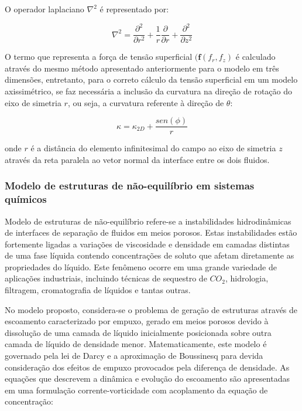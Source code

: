\documentclass[a4paper,portuges,12pt]{article}
\begin{document}
O operador laplaciano $\nabla^2$ é representado por:

\begin{equation}
	\nabla^2 
	=
	\frac{\partial^2}{\partial r^2}
	+
	\frac{1}{r}
	\frac{\partial}{\partial r}
	+
	\frac{\partial^2}{\partial z^2}
\label{eq:laplacianAxi}
\end{equation}\vspace{0.5cm}

O termo que representa a força de tensão superficial
$(\mathbf{f}(f_r,f_z)$ é calculado através do mesmo método apresentado
anteriormente para o modelo em três dimensões, entretanto, para o
correto cálculo da tensão superficial em um modelo axissimétrico, se faz
necessária a inclusão da curvatura na direção de rotação do eixo de
simetria $r$, ou seja, a curvatura referente à direção de $\theta$:

\begin{equation}
	\kappa = \kappa_{2D} + \frac{sen(\phi)}{r}
\label{eq:curvAxi}
\end{equation}\vspace{0.5cm}

\noindent onde $r$ é a distância do elemento infinitesimal do campo ao
eixo de simetria $z$ através da reta paralela ao vetor normal da
interface entre os dois fluidos.

\subsubsection{Modelo de estruturas de não-equilíbrio em sistemas
químicos}

Modelo de estruturas de não-equilíbrio refere-se a instabilidades
hidrodinâmicas de interfaces de separação de fluidos em meios porosos.
Estas instabilidades estão fortemente ligadas a variações de viscosidade e
densidade em camadas distintas de uma fase líquida contendo
concentrações de soluto que afetam diretamente as propriedades do
líquido. Este fenômeno ocorre em uma grande variedade de aplicações
industriais, incluindo técnicas de sequestro de $CO_2$, hidrologia,
filtragem, cromatografia de líquidos e tantas outras. 

No modelo proposto, considera-se o problema de geração de estruturas
através de escoamento caracterizado por empuxo, gerado em meios porosos
devido à dissolução de uma camada de líquido inicialmente posicionada
sobre outra camada de líquido de densidade menor. Matematicamente, este
modelo é governado pela lei de Darcy e a aproximação de Boussinesq para
devida consideração dos efeitos de empuxo provocados pela diferença de
densidade. As equações que descrevem a dinâmica e evolução do escoamento
são apresentadas em uma formulação corrente-vorticidade com acoplamento
da equação de concentração:
\end{document}
